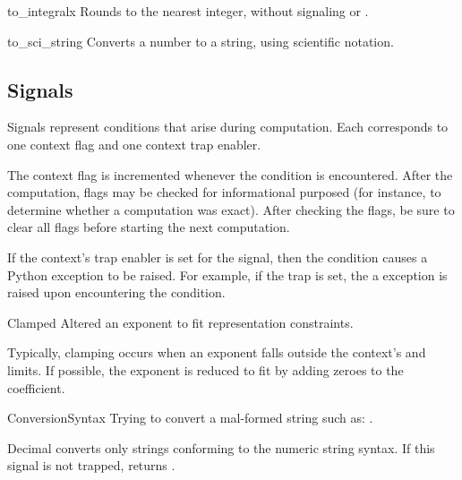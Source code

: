 \begin{methoddesc}{to_integral}{x}                  
  Rounds to the nearest integer, without signaling 
  or .                                        
\end{methoddesc} 

\begin{methoddesc}{to_sci_string}{}
  Converts a number to a string, using scientific notation.
\end{methoddesc} 



\subsection{Signals \label{decimal-signals}}

Signals represent conditions that arise during computation.
Each corresponds to one context flag and one context trap enabler.

The context flag is incremented whenever the condition is encountered.
After the computation, flags may be checked for informational
purposed (for instance, to determine whether a computation was exact).
After checking the flags, be sure to clear all flags before starting
the next computation.

If the context's trap enabler is set for the signal, then the condition
causes a Python exception to be raised.  For example, if the
 trap is set, the a 
exception is raised upon encountering the condition.


\begin{classdesc*}{Clamped}
    Altered an exponent to fit representation constraints.

    Typically, clamping occurs when an exponent falls outside the context's
     and  limits.  If possible, the exponent is
    reduced to fit by adding zeroes to the coefficient.
\end{classdesc*}

\begin{classdesc*}{ConversionSyntax}
    Trying to convert a mal-formed string such as:  .

    Decimal converts only strings conforming to the numeric string
    syntax.  If this signal is not trapped, returns .
\end{classdesc*}

